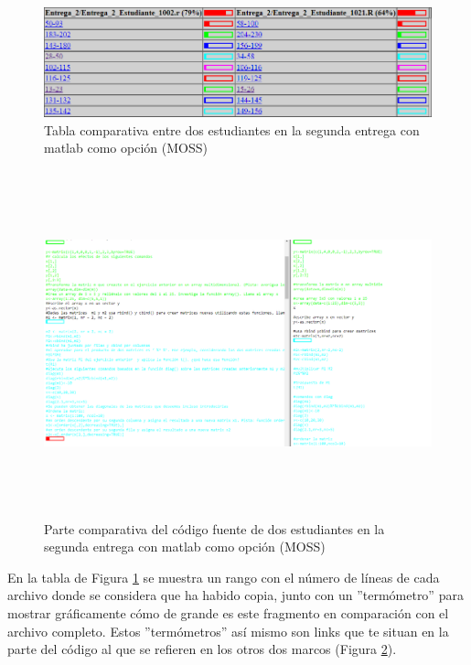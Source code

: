 \begin{figure}[] %
\centering
\includegraphics[scale=0.5]{imagenes/entrega2_MOSS_tabla.png}  %
\caption{Tabla comparativa entre dos estudiantes en la segunda entrega con matlab como opción (MOSS)} \label{fig:entrega2_MOSS_2}
\end{figure}


\begin{figure}[] %
\centering
\includegraphics[width=14cm, height=10cm]{imagenes/entrega2_MOSS_comp.png}  %
\caption{Parte comparativa del código fuente de dos estudiantes en la segunda entrega con matlab como opción (MOSS)} \label{fig:entrega2_MOSS_3}
\end{figure}


En la tabla de Figura \ref{fig:entrega2_MOSS_2} se muestra un rango con el número de líneas de cada archivo donde se considera que ha habido copia, junto con un ''termómetro'' para mostrar gráficamente cómo de grande es este fragmento en comparación con el archivo completo.
Estos ''termómetros'' así mismo son links que te situan en la parte del código al que se refieren en los otros dos marcos (Figura \ref{fig:entrega2_MOSS_3}).

